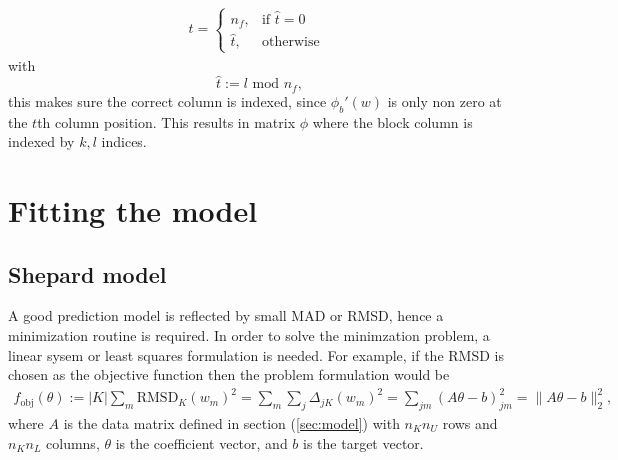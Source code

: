 \documentclass[12pt]{article}
\begin{document}
\begin{itemize}
\begin{equation}
\begin{split}
			t = 
			\begin{cases}
				n_f,  & \text{if } \hat{t} = 0 \\
				\hat{t}, & \text{otherwise}
			\end{cases}
			~~ 
		\end{split}
	\end{equation}
	with
	\begin{equation}
		\hat{t} := l \text{ mod } n_f,
	\end{equation}
	this makes sure the correct column is indexed, since $\phi_b'(w)$ is only non zero at the $t$th column position. This results in matrix $\phi$ where the block column is indexed by $k,l$ indices.
\end{itemize}

\section{Fitting the model}
\subsection{Shepard model}
A good prediction model is reflected by small MAD or RMSD, hence a minimization routine is required. In order to solve the minimzation problem, a linear sysem or least squares formulation is needed. For example, if the RMSD is chosen as the objective function then the problem formulation would be
\begin{equation}
    \label{eq:min}
    \begin{split}
        f_{\text{obj}}(\theta):= |K| \sum_m \text{RMSD}_K(w_m)^2 = \sum_m \sum_j \Delta_{jK}(w_m)^2 = \sum_{jm} \left( A\theta - b\right)_{jm}^2
         = \|A \theta - b\|_2^2,
    \end{split}
\end{equation}
where $A$ is the data matrix defined in section (\ref{sec:model}) with $n_Kn_U$ rows and $n_Kn_L$ columns, $\theta$ is the coefficient vector, and $b$ is the target vector.
\end{document}
